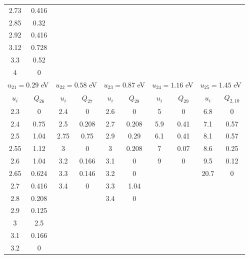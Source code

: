 \documentclass{report}
\begin{document}
\begin{tabular}{|c|c||c|c||c|c||c|c||c|c|}
2.73 & 0.416  &       &       &      &       &      &       &      &       \\ 
2.85 & 0.32   &       &       &      &       &      &       &      &       \\ 
2.92 & 0.416  &       &       &      &       &      &       &      &       \\ 
3.12 & 0.728  &       &       &      &       &      &       &      &       \\ 
3.3  & 0.52   &       &       &      &       &      &       &      &       \\ 
4    & 0      &       &       &      &       &      &       &      &       \\ 
\multicolumn{2}{|c||}{$u_{21}=0.29$ eV} &
\multicolumn{2}{c||}{$u_{22}=0.58$ eV} &
\multicolumn{2}{c||}{$u_{23}=0.87$ eV} &
\multicolumn{2}{c||}{$u_{24}=1.16$ eV} &
\multicolumn{2}{c|}{$u_{25}=1.45$ eV}\\
\hline
\hline 
$u_i$ & $Q_{26}$ & $u_i$ & $Q_{27}$ & $u_i$ & $Q_{28}$ & $u_i$ & $Q_{29}$ & $u_i$ & $Q_{2,10}$ \\                                                                             
\hline
2.3  & 0      & 2.4   & 0     & 2.6   & 0     & 5    & 0    & 6.8  & 0     \\
2.4  & 0.75   & 2.5   & 0.208 & 2.7   & 0.208 & 5.9  & 0.41 & 7.1  & 0.57  \\
2.5  & 1.04   & 2.75  & 0.75  & 2.9   & 0.29  & 6.1  & 0.41 & 8.1  & 0.57  \\
2.55 & 1.12   & 3     & 0     & 3     & 0.208 & 7    & 0.07 & 8.6  & 0.25  \\
2.6  & 1.04   & 3.2   & 0.166 & 3.1   & 0     & 9    & 0    & 9.5  & 0.12  \\
2.65 & 0.624  & 3.3   & 0.146 & 3.2   & 0     &      &      & 20.7 & 0     \\
2.7  & 0.416  & 3.4   & 0     & 3.3   & 1.04  &      &      &      &       \\
2.8  & 0.208  &       &       & 3.4   & 0     &      &      &      &       \\
2.9  & 0.125  &       &       &       &       &      &      &      &       \\
3    & 2.5    &       &       &       &       &      &      &      &       \\
3.1  & 0.166  &       &       &       &       &      &      &      &       \\
3.2  & 0      &       &       &       &       &      &      &      &       \\

\end{tabular}
\end{document}
